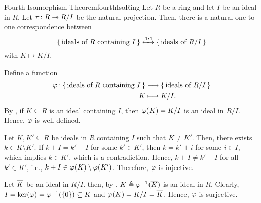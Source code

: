 \documentclass[../modern_algebra.tex]{subfiles}
\begin{document}
\begin{Theorem}{\textsf{Fourth Isomorphism Theorem}}{fourthIsoRing}
    Let \(R\) be a ring and let \(I\) be an ideal in \(R\).
    Let \(\pi \colon R \twoheadrightarrow R/I\) be the natural projection.
    Then, there is a natural one-to-one correspondence between
    \[
        \{\,\text{ideals of}~R~\text{containing}~I\,\} \xleftrightarrow{\text{1:1}}
        \{\,\text{ideals of}~R/I\,\}
    \]
    with \(K \mapsto K/I\).
\end{Theorem}
\begin{myproof}[Proof]
    Define a function
    \begin{align*}
        \varphi \colon \{\,\text{ideals of}~R~\text{containing}~I\,\} &\longrightarrow \{\,\text{ideals of}~R/I\,\} \\
        K &\longmapsto K/I.
    \end{align*}
    By , if \(K \subseteq R\) is an ideal containing \(I\),
    then \(\varphi(K) = K/I\) is an ideal in \(R/I\). Hence, \(\varphi\) is well-defined.

    Let \(K, K' \subseteq R\) be ideals in \(R\) containing \(I\) such that \(K \neq K'\).
    Then, there exists \(k \in K \setminus K'\).
    If \(k + I = k' + I\) for some \(k' \in K'\), then \(k = k' + i\) for some \(i \in I\),
    which implies \(k \in K'\), which is a contradiction.
    Hence, \(k + I \neq k' + I\) for all \(k' \in K'\), i.e., \(k + I \in \varphi(K) \setminus \varphi(K')\).
    Therefore, \(\varphi\) is injective.

    Let \(\overline{K}\) be an ideal in \(R/I\).
    then, by , \(K \triangleq \varphi^{-1}(\overline{K})\) is an ideal in \(R\).
    Clearly, \(I = \ker(\varphi) = \varphi^{-1}(\{0\}) \subseteq K\) and \(\varphi(K) = K/I = \overline{K}\).
    Hence, \(\varphi\) is surjective.
\end{myproof}
\end{document}
